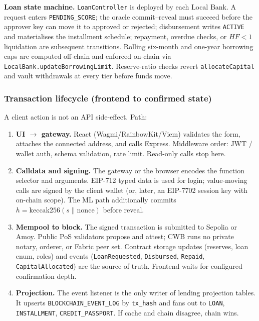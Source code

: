 \documentclass[11pt,a4paper]{article}
\begin{document}
\textbf{Loan state machine.} \texttt{LoanController} is deployed by each Local Bank. A request enters \texttt{PENDING\_SCORE}; the oracle commit--reveal must succeed before the approver key can move it to approved or rejected; disbursement writes \texttt{ACTIVE} and materialises the installment schedule; repayment, overdue checks, or $HF<1$ liquidation are subsequent transitions. Rolling six-month and one-year borrowing caps are computed off-chain and enforced on-chain via \texttt{LocalBank.updateBorrowingLimit}. Reserve-ratio checks revert \texttt{allocateCapital} and vault withdrawals at every tier before funds move.

\subsubsection{Transaction lifecycle (frontend to confirmed state)}

A client action is not an API side-effect. Path:

\begin{enumerate}
  \item \textbf{UI $\to$ gateway.} React (Wagmi/RainbowKit/Viem) validates the form, attaches the connected address, and calls Express. Middleware order: JWT / wallet auth, schema validation, rate limit. Read-only calls stop here.
  \item \textbf{Calldata and signing.} The gateway or the browser encodes the function selector and arguments. EIP-712 typed data is used for login; value-moving calls are signed by the client wallet (or, later, an EIP-7702 session key with on-chain scope). The ML path additionally commits $h=\mathrm{keccak256}(s\|\mathrm{nonce})$ before reveal.
  \item \textbf{Mempool to block.} The signed transaction is submitted to Sepolia or Amoy. Public PoS validators propose and attest; CWB runs no private notary, orderer, or Fabric peer set. Contract storage updates (reserves, loan enum, roles) and events (\texttt{LoanRequested}, \texttt{Disbursed}, \texttt{Repaid}, \texttt{CapitalAllocated}) are the source of truth. Frontend waits for configured confirmation depth.
  \item \textbf{Projection.} The event listener is the only writer of lending projection tables. It upserts \texttt{BLOCKCHAIN\_EVENT\_LOG} by \texttt{tx\_hash} and fans out to \texttt{LOAN}, \texttt{INSTALLMENT}, \texttt{CREDIT\_PASSPORT}. If cache and chain disagree, chain wins.
\end{enumerate}
\end{document}
